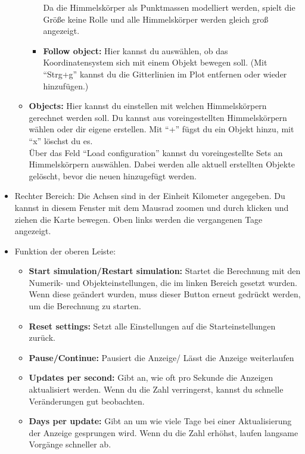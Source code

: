 \documentclass{scrartcl}
\begin{document}
\begin{itemize}[leftmargin=*]
\begin{itemize}
\begin{itemize}
                    Da die Himmelskörper als Punktmassen modelliert werden, spielt die Größe keine Rolle und alle Himmelskörper werden gleich groß angezeigt.
                    \item \textbf{Follow object:} Hier kannst du auswählen, ob das Koordinatensystem sich mit einem Objekt bewegen soll.
                    (Mit "`Strg+g"' kannst du die Gitterlinien im Plot entfernen oder wieder hinzufügen.)
                    \end{itemize}
                    \item \textbf{Objects:} Hier kannst du einstellen mit welchen Himmelskörpern gerechnet werden soll. Du kannst aus voreingestellten Himmelskörpern wählen oder dir eigene erstellen. 
                    Mit "`+"' fügst du ein Objekt hinzu, mit "`{\sffamily x}"' löschst du es.\\
                    Über das Feld "`Load configuration"' kannst du voreingestellte Sets an Himmelskörpern auswählen. Dabei werden alle aktuell erstellten Objekte gelöscht, bevor die neuen hinzugefügt werden.
                \end{itemize}
            \item Rechter Bereich:  
                Die Achsen sind in der Einheit Kilometer angegeben. 
                Du kannst in diesem Fenster mit dem Mausrad zoomen und durch klicken und ziehen die Karte bewegen.
                Oben links werden die vergangenen Tage angezeigt.
            \item Funktion der oberen Leiste:
                \begin{itemize}
                    \item \textbf{Start simulation/Restart simulation:} Startet die Berechnung mit den Numerik- und Objekteinstellungen, die im linken Bereich gesetzt wurden.
                    Wenn diese geändert wurden, muss dieser Button erneut gedrückt werden, um die Berechnung zu starten.
                    \item \textbf{Reset settings:} Setzt alle Einstellungen auf die Starteinstellungen zurück.
                    \item \textbf{Pause/Continue:} Pausiert die Anzeige/ Lässt die Anzeige weiterlaufen
                    \item \textbf{Updates per second:} Gibt an, wie oft pro Sekunde die Anzeigen aktualisiert werden. 
                            Wenn du die Zahl verringerst, kannst du schnelle Veränderungen gut beobachten.
                    \item \textbf{Days per update:} Gibt an um wie viele Tage bei einer Aktualisierung der Anzeige gesprungen wird.
                            Wenn du die Zahl erhöhst, laufen langsame Vorgänge schneller ab.
                \end{itemize}
        \end{itemize}
        
\end{document}
